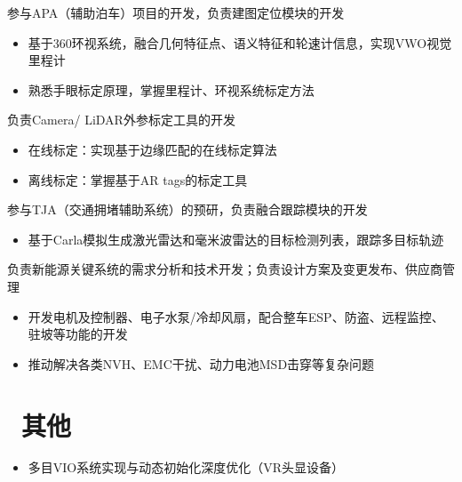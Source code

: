 \documentclass{resume}
\begin{document}
\begin{onehalfspacing}
  参与APA（辅助泊车）项目的开发，负责建图定位模块的开发
  \begin{itemize}
    \item 基于360环视系统，融合几何特征点、语义特征和轮速计信息，实现VWO视觉里程计
    \item 熟悉手眼标定原理，掌握里程计、环视系统标定方法
  \end{itemize}

  负责Camera/ LiDAR外参标定工具的开发
  \begin{itemize}
    \item 在线标定：实现基于边缘匹配的在线标定算法
    \item 离线标定：掌握基于AR tags的标定工具
  \end{itemize}

  参与TJA（交通拥堵辅助系统）的预研，负责融合跟踪模块的开发
  \begin{itemize}
    \item 基于Carla模拟生成激光雷达和毫米波雷达的目标检测列表，跟踪多目标轨迹
  \end{itemize}
\end{onehalfspacing}

负责新能源关键系统的需求分析和技术开发；负责设计方案及变更发布、供应商管理

\begin{onehalfspacing}
  \begin{itemize}
    \item 开发电机及控制器、电子水泵/冷却风扇，配合整车ESP、防盗、远程监控、驻坡等功能的开发
    \item 推动解决各类NVH、EMC干扰、动力电池MSD击穿等复杂问题
  \end{itemize}
\end{onehalfspacing}


\section{\faCode\ 其他}
\begin{itemize}[parsep=0.5ex]
  \item 多目VIO系统实现与动态初始化深度优化（VR头显设备）
\end{itemize}

%
%
\end{document}
